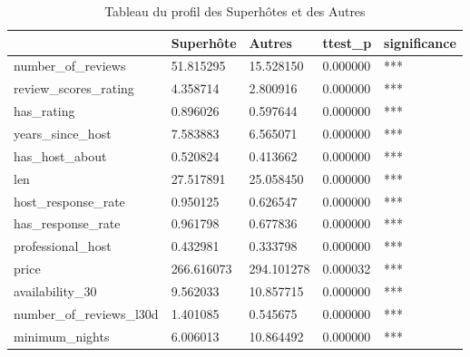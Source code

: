 \begin{table}
\caption{Tableau du profil des Superhôtes et des Autres}
\label{tab:table_host}
\begin{tabular}{lllll}
\toprule
 & Superhôte & Autres & ttest_p & significance \\
\midrule
number_of_reviews & 51.815295 & 15.528150 & 0.000000 & *** \\
review_scores_rating & 4.358714 & 2.800916 & 0.000000 & *** \\
has_rating & 0.896026 & 0.597644 & 0.000000 & *** \\
years_since_host & 7.583883 & 6.565071 & 0.000000 & *** \\
has_host_about & 0.520824 & 0.413662 & 0.000000 & *** \\
len & 27.517891 & 25.058450 & 0.000000 & *** \\
host_response_rate & 0.950125 & 0.626547 & 0.000000 & *** \\
has_response_rate & 0.961798 & 0.677836 & 0.000000 & *** \\
professional_host & 0.432981 & 0.333798 & 0.000000 & *** \\
price & 266.616073 & 294.101278 & 0.000032 & *** \\
availability_30 & 9.562033 & 10.857715 & 0.000000 & *** \\
number_of_reviews_l30d & 1.401085 & 0.545675 & 0.000000 & *** \\
minimum_nights & 6.006013 & 10.864492 & 0.000000 & *** \\
\bottomrule
\end{tabular}
\end{table}
